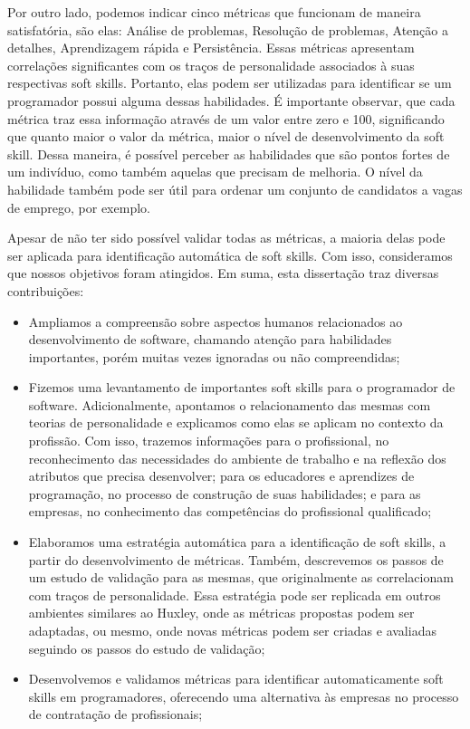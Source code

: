 Por outro lado, podemos indicar cinco métricas que funcionam de maneira satisfatória, são elas: Análise de problemas, Resolução de problemas, Atenção a detalhes, Aprendizagem rápida e Persistência. Essas métricas apresentam correlações significantes com os traços de personalidade associados à suas respectivas soft skills.
Portanto, elas podem ser utilizadas para identificar se um programador possui alguma dessas habilidades. É importante observar, que cada métrica traz essa informação através de um valor entre zero e 100, significando que quanto maior o valor da métrica, maior o nível de desenvolvimento da soft skill. Dessa maneira, é possível perceber as habilidades que são pontos fortes de um indivíduo, como também aquelas que precisam de melhoria. O nível da habilidade também pode ser útil para ordenar um conjunto de candidatos a vagas de emprego, por exemplo.

Apesar de não ter sido possível validar todas as métricas, a maioria delas pode ser aplicada para identificação automática de soft skills. Com isso, consideramos que nossos objetivos foram atingidos. Em suma, esta dissertação traz diversas contribuições:

\begin{itemize}
 \item Ampliamos a compreensão sobre aspectos humanos relacionados ao desenvolvimento de software, chamando atenção para habilidades importantes, porém muitas vezes ignoradas ou não compreendidas; 

 \item Fizemos uma levantamento de importantes soft skills para o programador de software. Adicionalmente, apontamos o relacionamento das mesmas com teorias de personalidade e explicamos como elas se aplicam no contexto da profissão. Com isso, trazemos informações para o profissional, no reconhecimento das necessidades do ambiente de trabalho e na reflexão dos atributos que precisa desenvolver; para os educadores e aprendizes de programação, no processo de construção de suas habilidades; e para as empresas, no conhecimento das competências do profissional qualificado;

 \item Elaboramos uma estratégia automática para a identificação de soft skills, a partir do desenvolvimento de métricas. Também, descrevemos os passos de um estudo de validação para as mesmas, que originalmente as correlacionam com traços de personalidade.
Essa estratégia pode ser replicada em outros ambientes similares ao Huxley, onde as métricas propostas podem ser adaptadas, ou mesmo, onde novas métricas podem ser criadas e avaliadas seguindo os passos do estudo de validação;

 \item Desenvolvemos e validamos métricas para identificar automaticamente soft skills em programadores, oferecendo uma alternativa às empresas no processo de contratação de profissionais;
\end{itemize}

